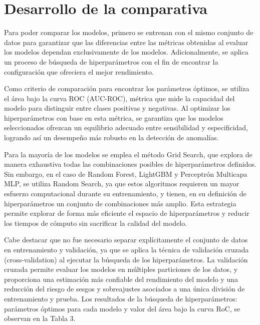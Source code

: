 \documentclass[11pt,a4paper,spanish]{book}
\numberwithin{equation}{chapter}
\numberwithin{figure}{chapter}
\begin{document}
\section{Desarrollo de la comparativa}

Para poder comparar los modelos, primero se entrenan con el mismo conjunto de datos para garantizar que las diferencias entre las métricas obtenidas al evaluar los modelos dependan exclusivamente de los modelos. Adicionalmente, se aplica un proceso de búsqueda de hiperparámetros con el fin de encontrar la configuración que ofreciera el mejor rendimiento. 

Como criterio de comparación para encontrar los parámetros óptimos, se utiliza el área bajo la curva ROC (AUC-ROC), métrica que mide la capacidad del modelo para distinguir entre clases positivas y negativas. Al optimizar los hiperparámetros con base en esta métrica, se garantiza que los modelos seleccionados ofrezcan un equilibrio adecuado entre sensibilidad y especificidad, logrando así un desempeño más robusto en la detección de anomalías.

Para la mayoría de los modelos se emplea el método Grid Search, que explora de manera exhaustiva todas las combinaciones posibles de hiperparámetros definidos. Sin embargo, en el caso de Random Forest, LightGBM y Perceptrón Multicapa MLP,  se utiliza Random Search, ya que estos algoritmos requieren un mayor esfuerzo computacional durante su entrenamiento, y tienen, en su definición de hiperparámetros un conjunto de combinaciones más amplio. Esta estrategia permite explorar de forma más eficiente el espacio de hiperparámetros y reducir los tiempos de cómputo sin sacrificar la calidad del modelo.

Cabe destacar que no fue necesario separar explícitamente el conjunto de datos en entrenamiento y validación, ya que se aplica la técnica de validación cruzada (cross-validation) al ejecutar la búsqueda de los hiperparámetros. La validación cruzada permite evaluar los modelos en múltiples particiones de los datos, y proporciona una estimación más confiable del rendimiento del modelo y una reducción  del riesgo de sesgos y sobreajustes asociados a una única división de entrenamiento y prueba. Los resultados de la búsqueda de hiperparámetros: parámetros óptimos para cada modelo y valor del área bajo la curva RoC, se observan en la Tabla 3.  
\end{document}

